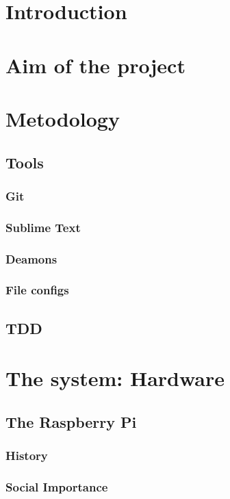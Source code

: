
\chapter{Introduction}

\chapter{Aim of the project}

\chapter{Metodology}
	\section{Tools}
		\subsection{Git}
		\subsection{Sublime Text}
		\subsection{Deamons}
		\subsection{File configs}
	\section{TDD}
\chapter{The system: Hardware}
	\section{The Raspberry Pi}
		\subsection{History}
		\subsection{Social Importance}
